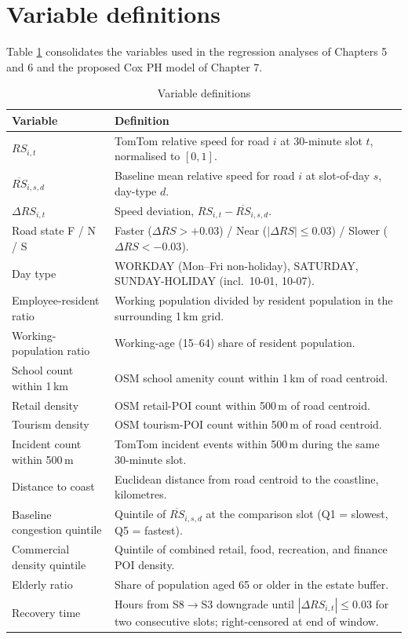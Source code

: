\documentclass[12pt,a4paper]{report}
\begin{document}
\section{Variable definitions}
Table \ref{tab:variable_defs} consolidates the variables used in the regression analyses of Chapters 5 and 6 and the proposed Cox PH model of Chapter 7.

\begin{table}[H]
\centering
\caption{Variable definitions}
\label{tab:variable_defs}
\begin{tabularx}{\textwidth}{lX}
\toprule
Variable & Definition \\
\midrule
$RS_{i,t}$ & TomTom relative speed for road $i$ at 30-minute slot $t$, normalised to $[0,1]$. \\
$\overline{RS}_{i,s,d}$ & Baseline mean relative speed for road $i$ at slot-of-day $s$, day-type $d$. \\
$\Delta RS_{i,t}$ & Speed deviation, $RS_{i,t} - \overline{RS}_{i,s,d}$. \\
Road state F / N / S & Faster ($\Delta RS > +0.03$) / Near ($|\Delta RS| \le 0.03$) / Slower ($\Delta RS < -0.03$). \\
Day type & WORKDAY (Mon--Fri non-holiday), SATURDAY, SUNDAY-HOLIDAY (incl.\ 10-01, 10-07). \\
Employee-resident ratio & Working population divided by resident population in the surrounding 1\,km grid. \\
Working-population ratio & Working-age (15--64) share of resident population. \\
School count within 1\,km & OSM school amenity count within 1\,km of road centroid. \\
Retail density & OSM retail-POI count within 500\,m of road centroid. \\
Tourism density & OSM tourism-POI count within 500\,m of road centroid. \\
Incident count within 500\,m & TomTom incident events within 500\,m during the same 30-minute slot. \\
Distance to coast & Euclidean distance from road centroid to the coastline, kilometres. \\
Baseline congestion quintile & Quintile of $\overline{RS}_{i,s,d}$ at the comparison slot (Q1 = slowest, Q5 = fastest). \\
Commercial density quintile & Quintile of combined retail, food, recreation, and finance POI density. \\
Elderly ratio & Share of population aged 65 or older in the estate buffer. \\
Recovery time & Hours from S8$\rightarrow$S3 downgrade until $|\Delta RS_{i,t}| \le 0.03$ for two consecutive slots; right-censored at end of window. \\
\bottomrule
\end{tabularx}
\end{table}
\end{document}
